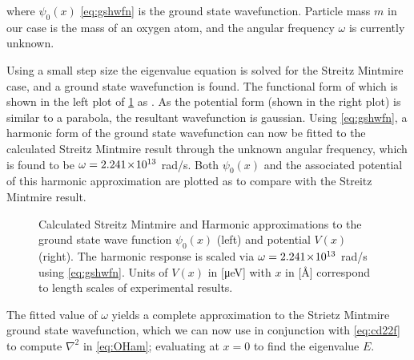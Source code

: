 where $\psi_0(x)$ \cref{eq:gshwfn} is the ground state wavefunction. Particle mass $m$ in our case is the mass of an oxygen atom, and the angular frequency $\omega$ is currently unknown.

Using a small step size the eigenvalue equation is solved for the Streitz Mintmire case, and a ground state wavefunction is found.
The functional form of which is shown in the left plot of \cref{fig:smvh} as .
As the potential form (shown in the right plot) is similar to a parabola, the resultant wavefunction is gaussian.
Using \cref{eq:gshwfn}, a harmonic form of the ground state wavefunction can now be fitted to the calculated Streitz Mintmire result through the unknown angular frequency, which is found to be $\omega = 2.241\!\times\!10^{13}$ rad/s.
Both $\psi_0(x)$ and the associated potential of this harmonic approximation are plotted as  to compare with the Streitz Mintmire result.
\begin{figure}[htp]
\centering
\resizebox{\widefigure}{!}{}
\parbox{\widefigure}{\caption[Harmonic Approximation to Strietz Mintmire]{\label{fig:smvh}Calculated Streitz Mintmire  and Harmonic approximations  to the ground state wave function $\psi_0(x)$ (left) and potential $V(x)$ (right). The harmonic response is scaled via $\omega = 2.241\!\times\!10^{13}$ rad/s using \cref{eq:gshwfn}. Units of $V(x)$ in [μeV] with $x$ in [Å] correspond to length scales of experimental results.}}
\end{figure}

The fitted value of $\omega$ yields a complete approximation to the Strietz Mintmire ground state wavefunction, which we can now use in conjunction with \cref{eq:cd22f} to compute $\nabla^2$ in \cref{eq:OHam}; evaluating at $x = 0$ to find the eigenvalue $E$.

